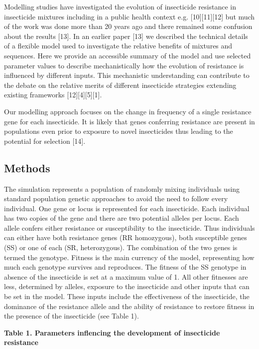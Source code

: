 \documentclass[11pt,]{article}
\begin{document}
Modelling studies have investigated the evolution of insecticide
resistance in insecticide mixtures including in a public health context
e.g. {[}10{]}{[}11{]}{[}12{]} but much of the work was done more than 20
years ago and there remained some confusion about the results {[}13{]}.
In an earlier paper {[}13{]} we described the technical details of a
flexible model used to investigate the relative benefits of mixtures and
sequences. Here we provide an accessible summary of the model and use
selected parameter values to describe mechanistically how the evolution
of resistance is influenced by different inputs. This mechanistic
understanding can contribute to the debate on the relative merits of
different insecticide strategies extending existing frameworks
{[}12{]}{[}4{]}{[}5{]}{[}1{]}.

Our modelling approach focuses on the change in frequency of a single
resistance gene for each insecticide. It is likely that genes conferring
resistance are present in populations even prior to exposure to novel
insecticides thus leading to the potential for selection {[}14{]}.

\subsection{Methods}\label{methods}

The simulation represents a population of randomly mixing individuals
using standard population genetic approaches to avoid the need to follow
every individual. One gene or locus is represented for each insecticide.
Each individual has two copies of the gene and there are two potential
alleles per locus. Each allele confers either resistance or
susceptibility to the insecticide. Thus individuals can either have both
resistance genes (RR homozygous), both susceptible genes (SS) or one of
each (SR, heterozygous). The combination of the two genes is termed the
genotype. Fitness is the main currency of the model, representing how
much each genotype survives and reproduces. The fitness of the SS
genotype in absence of the insecticide is set at a maximum value of 1.
All other fitnesses are less, determined by alleles, exposure to the
insecticide and other inputs that can be set in the model. These inputs
include the effectiveness of the insecticide, the dominance of the
resistance allele and the ability of resistance to restore fitness in
the presence of the insecticide (see Table 1).

\textbf{Table 1. Parameters inflencing the development of insecticide
resistance}
\end{document}
